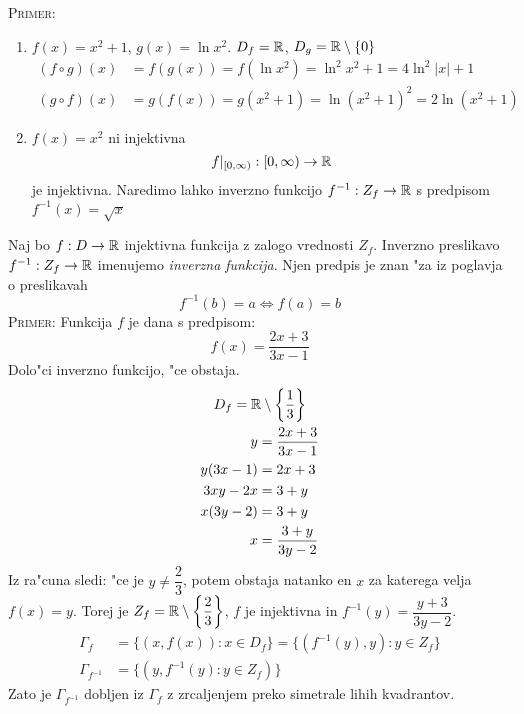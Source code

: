 \textsc{Primer:}
\begin{enumerate}[1)]
	\item $f(x) = x^2 + 1$, $g(x) = \ln x^2$. $D_f = \mathbb{R}$, $D_g =\mathbb{R} \setminus \{0\}$
	\begin{align*}
	(f \circ g)(x) &= f(g(x)) = f(\ln x^2) = \ln^2 x^2 + 1 = 4\ln^2|x| + 1 \\
	(g \circ f)(x) &= g(f(x)) = g(x^2 + 1) = \ln(x^2 + 1)^2 = 2 \ln(x^2 + 1)
	\end{align*}
	
	\item $f(x) = x^2$ ni injektivna
	\begin{equation*}
	f|_{[0, \infty)}: [0, \infty) \to \mathbb{R}
	\end{equation*}
	je injektivna. Naredimo lahko inverzno funkcijo $f^{-1} : Z_f \to \mathbb{R}$ s predpisom $f^{-1}(x) = \sqrt{x}$
\end{enumerate}
 Naj bo $f: D \to \mathbb{R}$ injektivna funkcija z zalogo vrednosti $Z_f$. Inverzno preslikavo $f^{-1}: Z_f \to \mathbb{R}$ imenujemo \emph{inverzna funkcija}. Njen predpis je znan "za iz poglavja o preslikavah
\begin{equation*}
f^{-1}(b) = a \iff f(a) = b
\end{equation*}
\textsc{Primer:} Funkcija $f$ je dana s predpisom:
\begin{equation*}
f(x) = \dfrac{2x + 3}{3x - 1}
\end{equation*}
Dolo"ci inverzno funkcijo, "ce obstaja.
\begin{gather*}
D_f = \mathbb{R} \setminus \left\{\dfrac{1}{3}\right\}\\
\begin{aligned}
y &= \dfrac{2x + 3}{3x-1} \\
y(3x - 1) &= 2x + 3 \\
3xy - 2x &= 3 + y \\
x(3y - 2) &= 3 + y \\
x &= \dfrac{3 + y}{3y- 2}
\end{aligned}
\end{gather*}
Iz ra"cuna sledi: "ce je $y \neq \dfrac{2}{3}$, potem obstaja natanko en $x$ za katerega velja $f(x) = y$. Torej je $Z_f = \mathbb{R} \setminus \left\{\dfrac{2}{3}\right\}$, $f$ je injektivna in $f^{-1}(y) = \dfrac{y+3}{3y - 2}$.
%
\begin{align*}
\Gamma_f &= \{(x, f(x)): x \in D_f\} = \{(f^{-1}(y), y): y \in Z_f\} \\
\Gamma_{f^{-1}} &= \{(y, f^{-1}(y): y \in Z_f)\}
\end{align*}
Zato je $\Gamma_{f^{-1}}$ dobljen iz $\Gamma_f$ z zrcaljenjem preko simetrale lihih kvadrantov.

